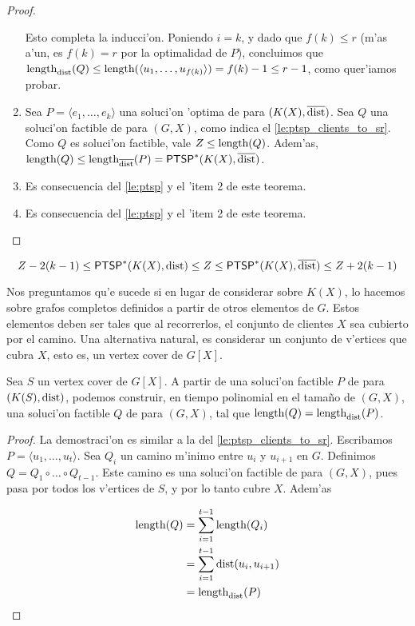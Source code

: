 \begin{theorem}
\begin{proof}
\begin{enumerate}
Esto completa la inducci'on. Poniendo $i = k$, y dado que $f(k) \leq r$ (m'as a'un, es $f(k) = r$ por la optimalidad de $P$), concluimos que $\textnormal{length}_{\textnormal{dist}}(Q) \leq \textnormal{length}(\langle u_1, \dots, u_{f(k)}\rangle) = f(k) - 1 \leq r - 1$, como quer'iamos probar.

\item Sea $P = \langle e_1, \dots, e_k \rangle$ una soluci'on 'optima de  para $(K(X), \overline{\textnormal{dist}})$. Sea $Q$ una soluci'on factible de  para $(G, X)$, como indica el \autoref{le:ptsp_clients_to_sr}. Como $Q$ es soluci'on factible, vale $Z \leq \textnormal{length}(Q)$. Adem'as, $\textnormal{length}(Q) \leq \textnormal{length}_{\overline{\textnormal{dist}}}(P) = \textnormal{\textsf{PTSP}}^*(K(X), \overline{\textnormal{dist}})$.

\item Es consecuencia del \autoref{le:ptsp} y el 'item 2 de este teorema.
\item Es consecuencia del \autoref{le:ptsp} y el 'item 2 de este teorema.
\end{enumerate}
\end{proof}
\end{theorem}

\begin{corollary}
\label{co:clients_bounds}
\[Z - 2(k - 1) \leq \textnormal{\textsf{PTSP}}^*(K(X), \textnormal{dist}) \leq Z \leq \textnormal{\textsf{PTSP}}^*(K(X), \overline{\textnormal{dist}}) \leq Z + 2(k - 1)\]
\end{corollary}

Nos preguntamos qu'e sucede si en lugar de considerar  sobre $K(X)$, lo hacemos sobre grafos completos definidos a partir de otros elementos de $G$. Estos elementos deben ser tales que al recorrerlos, el conjunto de clientes $X$ sea cubierto por el camino. Una alternativa natural, es considerar un conjunto de v'ertices que cubra $X$, esto es, un vertex cover de $G[X]$.

\begin{lemma}
\label{le:ptsp_vc_to_sr}
Sea $S$ un vertex cover de $G[X]$. A partir de una soluci'on factible $P$ de  para $(K(S), \textnormal{dist})$, podemos construir, en tiempo polinomial en el tama\~no de $(G, X)$, una soluci'on factible $Q$ de  para $(G, X)$, tal que $\textnormal{length}(Q) = \textnormal{length}_{\textnormal{dist}}(P)$.

\begin{proof}
La demostraci'on es similar a la del \autoref{le:ptsp_clients_to_sr}. Escribamos $P = \langle u_1, \dots, u_t \rangle$. Sea $Q_i$ un camino m'inimo entre $u_i$ y $u_{i + 1}$ en $G$. Definimos $Q = Q_1 \circ \dots \circ Q_{t - 1}$. Este camino es una soluci'on factible de  para $(G, X)$, pues pasa por todos los v'ertices de $S$, y por lo tanto cubre $X$. Adem'as

\begin{align*}
\textnormal{length}(Q) &= \sum_{i = 1}^{t - 1} \textnormal{length}(Q_i)\\
&= \sum_{i = 1}^{t - 1} \textnormal{dist}(u_i, u_{i + 1})\\
&= \textnormal{length}_{\textnormal{dist}}(P)\\
\end{align*}
\end{proof}
\end{lemma}

